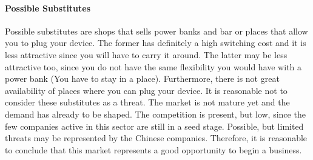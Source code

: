 \documentclass[12pt]{article}
\begin{document}
            \paragraph*{Possible Substitutes}
                Possible substitutes are shops that sells power banks and bar or places that allow you to plug your device. 
                The former has definitely a high switching cost and it is less attractive since you will have to carry it around. 
                The latter may be less attractive too, since you do not have the same flexibility you would have with a power bank (You have to stay in a place). 
                Furthermore, there is not great availability of places where you can plug your device. 
                It is reasonable not to consider these substitutes as a threat.
                The market is not mature yet and the demand has already to be shaped. 
                The competition is present, but low, since the few companies active in this sector are still in a seed stage. 
                Possible, but limited threats may be represented by the Chinese companies. 
                Therefore, it is reasonable to conclude that this market represents a good opportunity to begin a business.
\end{document}
